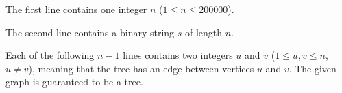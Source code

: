The first line contains one integer $n$ ($1 \le n \le 200000$).

The second line contains a binary string $s$ of length $n$.

Each of the following $n-1$ lines contains two integers $u$ and $v$
($1 \le u,v \le n$, $u \ne v$), meaning that the tree has an edge between
vertices $u$ and $v$. The given graph is guaranteed to be a tree.
